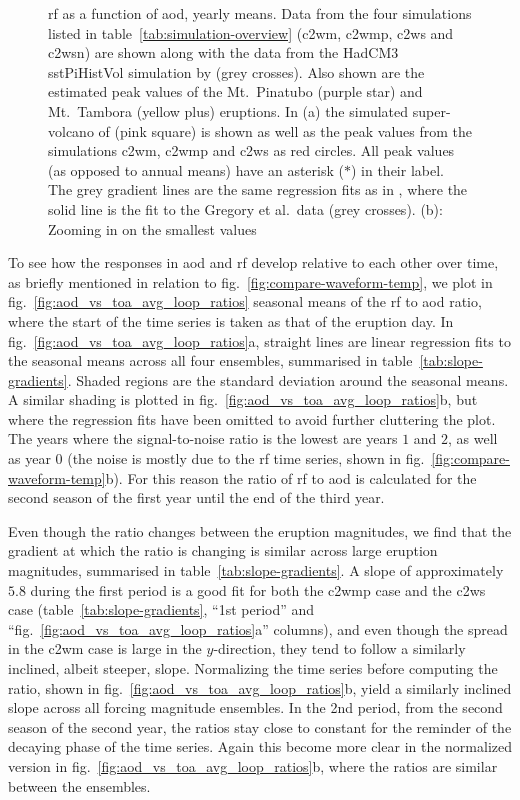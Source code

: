 \documentclass{ametsocV6.1}
\begin{document}
\begin{figure}
  \caption{\gls{rf} as a function of \gls{aod}, yearly means. Data from the four
    simulations listed in table~\ref{tab:simulation-overview} (\gls{c2wm}, \gls{c2wmp},
    \gls{c2ws} and \gls{c2wsn}) are shown along with the data from the HadCM3 sstPiHistVol
    simulation by \citet{gregory2016} (grey crosses). Also shown are the estimated peak
    values of the Mt.\ Pinatubo (purple star) and Mt.\ Tambora (yellow plus) eruptions. In
    (a) the simulated super-volcano of \citet{jones2005} (pink square) is shown as well as
    the peak values from the simulations \gls{c2wm}, \gls{c2wmp} and \gls{c2ws} as red
    circles. All peak values (as opposed to annual means) have an asterisk (\(\ast{}\)) in
    their label. The grey gradient lines are the same regression fits as in \citet[][Fig.\
      4]{gregory2016}, where the solid line is the fit to the Gregory et al.\ data (grey
    crosses). (b): Zooming in on the smallest values}\label{fig:aod_vs_toa_ses_avg}%
\end{figure}

To see how the responses in \gls{aod} and \gls{rf} develop relative to
each other over time, as briefly mentioned in relation to
fig.~\ref{fig:compare-waveform-temp}, we plot in fig.~\ref{fig:aod_vs_toa_avg_loop_ratios}
seasonal means of the \gls{rf} to \gls{aod} ratio, where the start of the time series is
taken as that of the eruption day. In fig.~\ref{fig:aod_vs_toa_avg_loop_ratios}a,
straight lines are linear regression fits to the seasonal means across all four
ensembles, summarised in table~\ref{tab:slope-gradients}. Shaded regions are the
standard deviation around the seasonal means. A similar shading is plotted in
fig.~\ref{fig:aod_vs_toa_avg_loop_ratios}b, but where the regression fits have been
omitted to avoid further cluttering the plot. The years where the signal-to-noise ratio
is the lowest are years \(1\) and \(2\), as well as year \(0\) (the noise is mostly due
to the \gls{rf} time series, shown in fig.~\ref{fig:compare-waveform-temp}b). For this
reason the ratio of \gls{rf} to \gls{aod} is calculated for the second season of the
first year until the end of the third year.

Even though the ratio changes between the eruption magnitudes, we find that the gradient
at which the ratio is changing is similar across large eruption magnitudes, summarised
in table~\ref{tab:slope-gradients}. A slope of approximately \(5.8\) during the first
period is a good fit for both the \gls{c2wmp} case and the \gls{c2ws} case
(table~\ref{tab:slope-gradients}, ``1st period'' and
``fig.~\ref{fig:aod_vs_toa_avg_loop_ratios}a'' columns), and even though the spread in
the \gls{c2wm} case is large in the \(y\)-direction, they tend to follow a similarly
inclined, albeit steeper, slope. Normalizing the time series before computing the ratio,
shown in fig.~\ref{fig:aod_vs_toa_avg_loop_ratios}b, yield a similarly inclined slope
across all forcing magnitude ensembles. In the 2nd period, from the second season of the
second year, the ratios stay close to constant for the reminder of the decaying phase of
the time series. Again this become more clear in the normalized version in
fig.~\ref{fig:aod_vs_toa_avg_loop_ratios}b, where the ratios are similar between the
ensembles.
\end{document}

